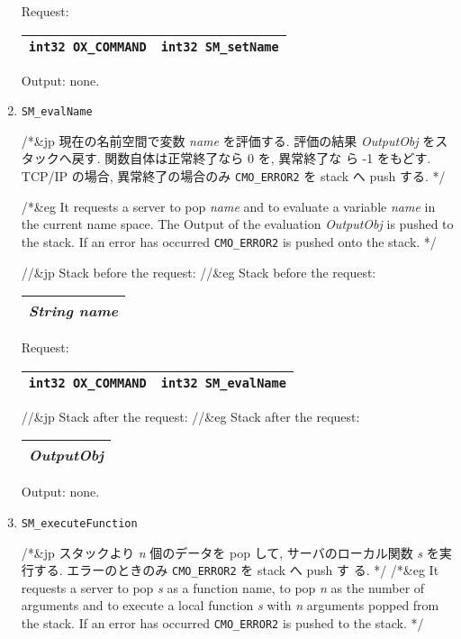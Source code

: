 \begin{enumerate}
Request:
\begin{tabular}{|c|c|}  \hline
{\tt int32 OX\_COMMAND} & {\tt int32 SM\_setName} \\
\hline
\end{tabular}

Output: none.

\item
\begin{verbatim}
SM_evalName
\end{verbatim}

/*&jp
現在の名前空間で変数 {\it name} を評価する.  評価の結果 {\it
OutputObj} をスタックへ戻す.  関数自体は正常終了なら 0 を, 異常終了な
ら -1 をもどす.  TCP/IP の場合, 異常終了の場合のみ {\tt CMO\_ERROR2} 
を stack へ push する.
*/

/*&eg
It requests a server to pop {\it name} and to evaluate a variable
{\it name} in the current name space. The Output of the evaluation
{\it OutputObj} is pushed to the stack.
If an error has occurred {\tt CMO\_ERROR2} is pushed onto the stack.
*/

//&jp Stack before the request:
//&eg Stack before the request:
\begin{tabular}{|c|}  \hline
{\it String name}  \\
\hline
\end{tabular}

Request:
\begin{tabular}{|c|c|}  \hline
{\tt int32 OX\_COMMAND} & {\tt int32 SM\_evalName} \\
\hline
\end{tabular}

//&jp Stack after the request:
//&eg Stack after the request:
\begin{tabular}{|c|}  \hline
{\it OutputObj} \\
\hline
\end{tabular}

Output:  none.

\item
\begin{verbatim}
SM_executeFunction
\end{verbatim}
/*&jp
スタックより {\it n} 個のデータを pop して, サーバのローカル関数{\it
s} を実行する.  エラーのときのみ {\tt CMO\_ERROR2} を stack へ push す
る.
*/
/*&eg
It requests a server to pop {\it s} as a function name, 
to pop {\it n} as the number of arguments and to execute
a local function {\it s} with {\it n} arguments popped from
the stack.
If an error has occurred {\tt CMO\_ERROR2} is pushed to the stack.
*/


\end{enumerate}
